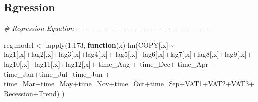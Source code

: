 \documentclass[
]{article}
\newenvironment{Shaded}{\begin{snugshade}}{\end{snugshade}}
\newcommand{\CommentTok}[1]{\textcolor[rgb]{0.56,0.35,0.01}{\textit{#1}}}
\newcommand{\ControlFlowTok}[1]{\textcolor[rgb]{0.13,0.29,0.53}{\textbf{#1}}}
\newcommand{\DecValTok}[1]{\textcolor[rgb]{0.00,0.00,0.81}{#1}}
\newcommand{\FunctionTok}[1]{\textcolor[rgb]{0.00,0.00,0.00}{#1}}
\newcommand{\NormalTok}[1]{#1}
\newcommand{\OtherTok}[1]{\textcolor[rgb]{0.56,0.35,0.01}{#1}}
\newcommand{\SpecialCharTok}[1]{\textcolor[rgb]{0.00,0.00,0.00}{#1}}
\begin{document}
\hypertarget{rgression}{%
\subsection{Rgression}\label{rgression}}

\begin{Shaded}
\begin{Highlighting}[]
\CommentTok{\# Regression Equation {-}{-}{-}{-}{-}{-}{-}{-}{-}{-}{-}{-}{-}{-}{-}{-}{-}{-}{-}{-}{-}{-}{-}{-}{-}{-}{-}{-}{-}{-}{-}{-}{-}{-}{-}{-}{-}{-}{-}{-}{-}{-}{-}{-}{-}{-}{-}{-}{-}{-}{-}{-}{-}}


\NormalTok{reg.model }\OtherTok{\textless{}{-}} \FunctionTok{lapply}\NormalTok{(}\DecValTok{1}\SpecialCharTok{:}\DecValTok{173}\NormalTok{, }\ControlFlowTok{function}\NormalTok{(x) }\FunctionTok{lm}\NormalTok{(COPY[,x] }\SpecialCharTok{\textasciitilde{}}\NormalTok{ lag1[,x]}\SpecialCharTok{+}\NormalTok{lag2[,x]}\SpecialCharTok{+}\NormalTok{lag3[,x]}\SpecialCharTok{+}\NormalTok{lag4[,x]}\SpecialCharTok{+}
\NormalTok{                                            lag5[,x]}\SpecialCharTok{+}\NormalTok{lag6[,x]}\SpecialCharTok{+}\NormalTok{lag7[,x]}\SpecialCharTok{+}\NormalTok{lag8[,x]}\SpecialCharTok{+}\NormalTok{lag9[,x]}\SpecialCharTok{+}
\NormalTok{                                            lag10[,x]}\SpecialCharTok{+}\NormalTok{lag11[,x]}\SpecialCharTok{+}\NormalTok{lag12[,x]}\SpecialCharTok{+}\NormalTok{ time\_Aug }\SpecialCharTok{+} 
\NormalTok{                                            time\_Dec}\SpecialCharTok{+}\NormalTok{ time\_Apr}\SpecialCharTok{+}\NormalTok{ time\_Jan}\SpecialCharTok{+}\NormalTok{time\_Jul}\SpecialCharTok{+}\NormalTok{time\_Jun }\SpecialCharTok{+}
\NormalTok{                                            time\_Mar}\SpecialCharTok{+}\NormalTok{time\_May}\SpecialCharTok{+}\NormalTok{time\_Nov}\SpecialCharTok{+}\NormalTok{time\_Oct}\SpecialCharTok{+}\NormalTok{time\_Sep}\SpecialCharTok{+}\NormalTok{VAT1}\SpecialCharTok{+}\NormalTok{VAT2}\SpecialCharTok{+}\NormalTok{VAT3}\SpecialCharTok{+}\NormalTok{Recession}\SpecialCharTok{+}\NormalTok{Trend)}
\NormalTok{)}


\end{Highlighting}
\end{Shaded}
\end{document}
